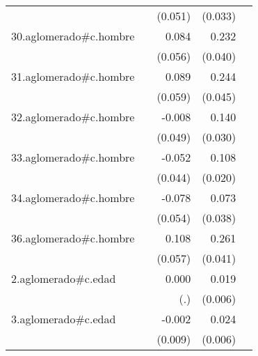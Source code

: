 {\begin{longtable}{l*{4}{D{.}{.}{-1}}}
            &                     &     (0.051)         &     (0.033)         &                     \\
\addlinespace
30.aglomerado#c.hombre&                     &       0.084         &       0.232\sym{***}&                     \\
            &                     &     (0.056)         &     (0.040)         &                     \\
\addlinespace
31.aglomerado#c.hombre&                     &       0.089         &       0.244\sym{***}&                     \\
            &                     &     (0.059)         &     (0.045)         &                     \\
\addlinespace
32.aglomerado#c.hombre&                     &      -0.008         &       0.140\sym{***}&                     \\
            &                     &     (0.049)         &     (0.030)         &                     \\
\addlinespace
33.aglomerado#c.hombre&                     &      -0.052         &       0.108\sym{***}&                     \\
            &                     &     (0.044)         &     (0.020)         &                     \\
\addlinespace
34.aglomerado#c.hombre&                     &      -0.078         &       0.073         &                     \\
            &                     &     (0.054)         &     (0.038)         &                     \\
\addlinespace
36.aglomerado#c.hombre&                     &       0.108         &       0.261\sym{***}&                     \\
            &                     &     (0.057)         &     (0.041)         &                     \\
\addlinespace
2.aglomerado#c.edad&                     &       0.000         &       0.019\sym{**} &                     \\
            &                     &         (.)         &     (0.006)         &                     \\
\addlinespace
3.aglomerado#c.edad&                     &      -0.002         &       0.024\sym{***}&                     \\
            &                     &     (0.009)         &     (0.006)         &                     \\

\end{longtable}}
